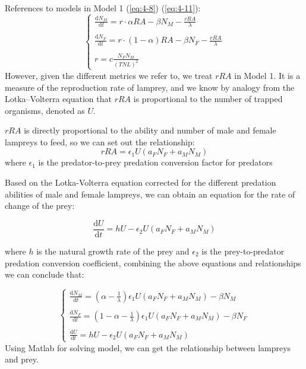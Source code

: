 \documentclass[12pt]{article}  %
\begin{document}
References to models in Model 1 (\ref{eq:4-8}) (\ref{eq:4-11}):
\begin{equation}\label{eq:5-2}
\begin{cases}
	\frac{\mathrm{d}N_{M}}{\mathrm{d}t}=r \cdot \alpha RA-\beta N_{M} - \frac{rRA}{\lambda}\\ \\
	\frac{\mathrm{d}N_{F}}{\mathrm{d}t}=r \cdot(1 - \alpha )RA-\beta N_{F} - \frac{rRA}{\lambda} \\ \\
	r = c\frac{N_{F}N_{M}}{(TNL)^{2}}
\end{cases}
\end{equation}
However, given the different metrics we refer to, we treat $rRA$ in Model 1. It is a measure of the reproduction rate of lamprey, and we know by analogy from the Lotka–Volterra equation that $rRA$ is proportional to the number of trapped organisms, denoted as $U$.

$rRA$ is directly proportional to the ability and number of male and female lampreys to feed, so we can set out the relationship:
\begin{equation}\label{eq:5-3}
rRA = \epsilon_{1} U (a_{F}N_{F}+a_{M}N_{M})
\end{equation}
where $\epsilon_1$ is the predator-to-prey predation conversion factor for predators

Based on the Lotka-Volterra equation corrected for the different predation abilities of male and female lampreys, we can obtain an equation for the rate of change of the prey:

\begin{equation}\label{eq:5-4}
\frac{\mathrm{d}U}{\mathrm{d}t}=hU-\epsilon_{2}U(a_{F}N_{F}+a_{M}N_{M})
\end{equation}

where $h$ is the natural growth rate of the prey and $\epsilon_2$ is the prey-to-predator predation conversion coefficient, combining the above equations and relationships we can conclude that:

\begin{equation}\label{eq:5-5}
\begin{cases}
	\frac{\mathrm{d}N_{M}}{\mathrm{d}t}=\left( \alpha-\frac{1}{\lambda} \right)\epsilon_{1}U(a_{F}N_{F}+a_{M}N_{M}) - \beta N_M\\ \\

	\frac{\mathrm{d}N_{F}}{\mathrm{d}t}=\left( 1- \alpha-\frac{1}{\lambda} \right)\epsilon_{1}U(a_{F}N_{F}+a_{M}N_{M}) - \beta N_F\\ \\
	\frac{\mathrm{d}U}{\mathrm{d}t}=hU-\epsilon_{2}U(a_{F}N_{F}+a_{M}N_{M})
\end{cases}
\end{equation}
Using Matlab for solving model, we can get the relationship between lampreys and prey.
\end{document}
